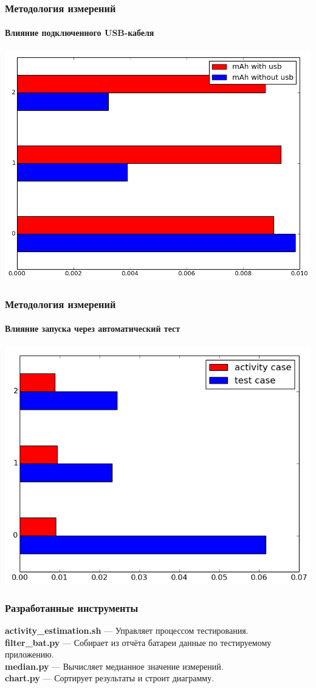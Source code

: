 \documentclass{beamer}
\begin{document}
    \begin{frame}
        \frametitle{Методология измерений}
        \framesubtitle{Влияние подключенного USB-кабеля}
        \begin{center}
            \includegraphics[width=0.9\linewidth]{usb_comparation}
        \end{center}
    \end{frame}
    \begin{frame}
        \frametitle{Методология измерений}
        \framesubtitle{Влияние запуска через автоматический тест}
        \begin{center}
            \includegraphics[width=0.8\linewidth]{test_comparation}
        \end{center}
    \end{frame}
    \begin{frame}
        \frametitle{Разработанные инструменты}
        \textbf{activity\_estimation.sh} --- Управляет процессом тестирования.~\\
        \textbf{filter\_bat.py} --- Собирает из отчёта батареи данные по тестируемому приложению.~\\
        \textbf{median.py} --- Вычисляет медианное значение измерений.~\\
        \textbf{chart.py} --- Сортирует результаты и строит диаграмму.
    \end{frame}
\end{document}
